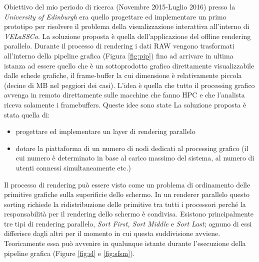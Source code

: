 \documentclass[a4paper,11pt]{paper}
\begin{document}
Obiettivo del mio periodo di ricerca (Novembre 2015-Luglio 2016) presso la \textit{University of Edinburgh} era quello progettare ed implementare un primo prototipo per risolvere il problema della visualizzazione interattiva all'interno di \textit{VELaSSCo}. La soluzione proposta è  quella dell'applicazione del offline rendering parallelo.
Durante il processo di rendering i dati RAW vengono trasformati  all'interno della pipeline grafica (Figura \ref{fig:pip}) fino ad arrivare in ultima istanza ad essere quello che è un sottoprodotto grafico direttamente visualizzabile dalle schede grafiche, il frame-buffer la cui  dimensione è relativamente piccola (decine di MB nel peggiori dei casi).
L'idea è quella che tutto il processing grafico avvenga in remoto direttamente sulle macchine che fanno HPC e che l'analista riceva solamente i framebuffers.
Queste idee sono state
La soluzione proposta è stata quella di:
\begin{itemize}
\item progettare ed implementare un layer di rendering parallelo
\item dotare la piattaforma di un numero di nodi dedicati al processing grafico (il cui numero è determinato in base al carico massimo del sistema, al numero di utenti connessi simultaneamente etc.)

\end{itemize}

Il processo di rendering può essere visto come un problema di ordinamento delle primitive grafiche sulla superificie dello schermo. In un renderer parallelo questo sorting richiede la ridistribuzione delle primitive tra tutti i processori perché la responsabilità per il rendering dello schermo è condivisa.
Esistono principalmente tre tipi di rendering parallelo, \textit{Sort First, Sort Middle} e \textit{Sort Last}; ognuno di essi differisce dagli altri per il momento in cui questa suddivisione avviene. Teoricamente essa può avvenire in qualunque istante durante l'esecuzione della pipeline grafica (Figure \ref{fig:sl} e \ref{fig:sfsm}).
\end{document}
